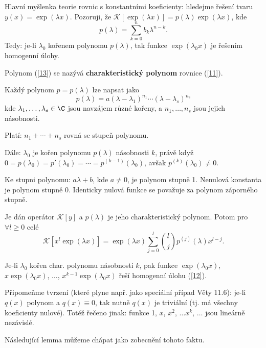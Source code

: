 \begin{poznamka}
Hlavní myšlenka teorie rovnic s konstantními koeficienty: hledejme řešení tvaru $y(x) = \exp(\lambda x)$. Pozoruji, že $\mathcal K [\exp(\lambda x)] = p(\lambda) \exp(\lambda x)$, kde
\begin{equation}\label{13}
p(\lambda) = \sum_{k=0}^n b_k \lambda^{n-k}.
\end{equation}
Tedy: je-li $\lambda_0$ kořenem polynomu $p(\lambda)$, tak funkce $\exp(\lambda_0 x)$ je řešením homogenní úlohy.
\end{poznamka}

\begin{definice}
Polynom (\ref{13}) se nazývá \textbf{charakteristický polynom} rovnice (\ref{11}).
\end{definice}

\begin{poznamka}
Každý polynom $p = p(\lambda)$ lze napsat jako
\[
p(\lambda) = a (\lambda - \lambda_1)^{n_1} \cdots (\lambda - \lambda_s)^{n_s}
\]
kde $\lambda_1, \ldots, \lambda_s \in \C$ jsou navzájem různé kořeny, a $n_1, \ldots, n_s$ jsou jejich násobnosti.

Platí: $n_1 + \cdots + n_s$ rovná se stupeň polynomu.

Dále: $\lambda_0$ je kořen polynomu $p(\lambda)$ násobnosti $k$, právě když $0 = p(\lambda_0) = p'(\lambda_0) = \cdots = p^{(k-1)}(\lambda_0)$, avšak $p^{(k)}(\lambda_0) \neq 0$.

Ke stupni polynomu: $a\lambda + b$, kde $a \neq 0$, je polynom stupně 1. Nenulová konstanta je polynom stupně 0. Identicky nulová funkce se považuje za polynom záporného stupně.
\end{poznamka}

\begin{lemma}
Je dán operátor $\mathcal K [y]$ a $p(\lambda)$ je jeho charakteristický polynom. Potom pro $\forall l \geq 0$ celé
\[
\mathcal K [x^l \exp(\lambda x)] = \exp(\lambda x) \sum_{j=0}^l \binom{l}{j} p^{(j)}(\lambda) x^{l-j}.
\]
\end{lemma}

\begin{dusledek}
Je-li $\lambda_0$ kořen char. polynomu násobnosti $k$, pak funkce $\exp(\lambda_0 x)$, $x \exp(\lambda_0 x)$, $\ldots$, $x^{k-1} \exp(\lambda_0 x)$ řeší homogenní úlohu (\ref{12}).
\end{dusledek}

\begin{poznamka}
Připomeňme tvrzení (které plyne např. jako speciální případ Věty 11.6): je-li $q(x)$ polynom a $q(x) \equiv 0$, tak nutně $q(x)$ je triviální (tj. má všechny koeficienty nulové). Totéž řečeno jinak: funkce 1, $x$, $x^2$, $\ldots x^k$, $\ldots$ jsou lineárně nezávislé.

Následující lemma můžeme chápat jako zobecnění tohoto faktu.
\end{poznamka}

